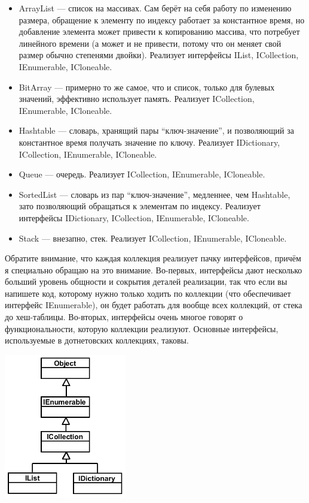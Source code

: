 \documentclass[a5paper]{article}
\begin{document}
\begin{itemize}
    \item ArrayList --- список на массивах. Сам берёт на себя работу по изменению размера, обращение к элементу по индексу работает за константное время, но добавление элемента может привести к копированию массива, что потребует линейного времени (а может и не привести, потому что он меняет свой размер обычно степенями двойки). Реализует интерфейсы IList, ICollection, IEnumerable, ICloneable.
    \item BitArray --- примерно то же самое, что и список, только для булевых значений, эффективно использует память. Реализует ICollection, IEnumerable, ICloneable.
    \item Hashtable --- словарь, хранящий пары ``ключ-значение'', и позволяющий за константное время получать значение по ключу. Реализует IDictionary, ICollection, IEnumerable, ICloneable.
    \item Queue --- очередь. Реализует ICollection, IEnumerable, ICloneable.
    \item SortedList --- словарь из пар ``ключ-значение'', медленнее, чем Hashtable, зато позволяющий обращаться к элементам по индексу. Реализует интерфейсы IDictionary, ICollection, IEnumerable, ICloneable.
    \item Stack --- внезапно, стек. Реализует ICollection, IEnumerable, ICloneable.
\end{itemize}

Обратите внимание, что каждая коллекция реализует пачку интерфейсов, причём я специально обращаю на это внимание. Во-первых, интерфейсы дают несколько больший уровень общности и сокрытия деталей реализации, так что если вы напишете код, которому нужно только ходить по коллекции (что обеспечивает интерфейс IEnumerable), он будет работать для вообще всех коллекций, от стека до хеш-таблицы. Во-вторых, интерфейсы очень многое говорят о функциональности, которую коллекции реализуют. Основные интерфейсы, используемые в дотнетовских коллекциях, таковы.

\begin{center}
    \includegraphics[width=0.4\textwidth]{interfaces.png}
\end{center}
\end{document}
